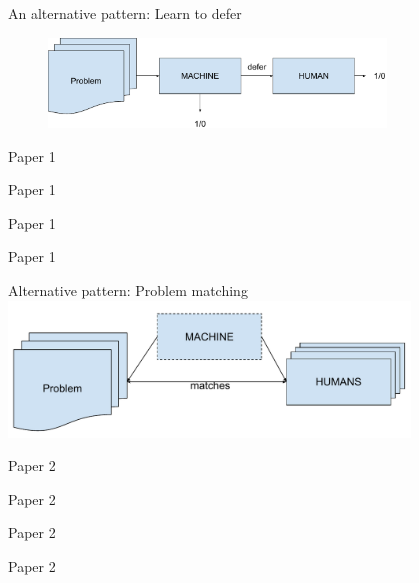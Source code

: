 \documentclass[11pt]{beamer}
\begin{document}
\begin{frame}{An alternative pattern: Learn to defer}
\begin{figure}[t!]
	\centering
	\includegraphics[width=0.8\textwidth]{Figures/defect.pdf}
\end{figure}
\end{frame}


\begin{frame}{Paper 1}
\end{frame}

\begin{frame}{Paper 1}
\end{frame}


\begin{frame}{Paper 1}
\end{frame}


\begin{frame}{Paper 1}
\end{frame}


\begin{frame}{Alternative pattern: Problem matching}
	\centering
\includegraphics[width=0.8\textwidth]{Figures/matching.pdf}
\end{frame}


\begin{frame}{Paper 2}
\end{frame}

\begin{frame}{Paper 2}
\end{frame}


\begin{frame}{Paper 2}
\end{frame}


\begin{frame}{Paper 2}
\end{frame}
\end{document}
